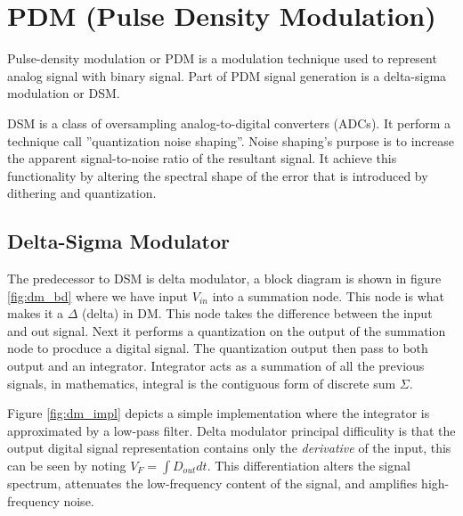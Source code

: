 \documentclass[11pt]{article}
\begin{document}
\section{PDM (Pulse Density Modulation)}

Pulse-density modulation or PDM is a modulation technique used to represent
analog signal with binary signal. Part of PDM signal generation is a delta-sigma
modulation or DSM. \cite{wiki:pdm}

DSM is a class of oversampling analog-to-digital converters (ADCs). It perform a
technique call ''quantization noise shaping''.\cite{wiki:dsm} Noise shaping's
purpose is to increase the apparent signal-to-noise ratio of the resultant
signal. It achieve this functionality by altering the spectral shape of
the error that is introduced by dithering and quantization.\cite{wiki:ns}

\subsection{Delta-Sigma Modulator}

The predecessor to DSM is delta modulator, a block diagram is shown in figure
\ref{fig:dm_bd} where we have input $V_{in}$ into a summation node. This node
is what makes it a $\Delta$ (delta) in DM. This node takes the difference
between the input and out signal. Next it performs a quantization on the output
of the summation node to procduce a digital signal. The quantization output then
pass to both output and an integrator. Integrator acts as a summation of all the
previous signals, in mathematics, integral is the contiguous form of discrete
sum $\Sigma$.

Figure \ref{fig:dm_impl} depicts a simple implementation where the integrator is
approximated by a low-pass filter. Delta modulator principal difficulity is that the
output digital signal representation contains only the \textit{derivative} of
the input, this can be seen by noting $V_F = \int D_{out} dt$. This
differentiation alters the signal spectrum, attenuates the low-frequency content
of the signal, and amplifies high-frequency noise.\cite{article:dsm}
\end{document}
